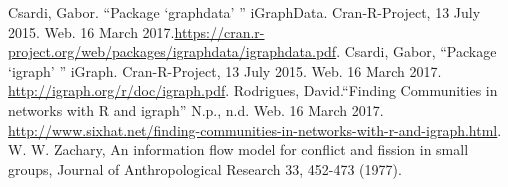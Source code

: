 \documentclass[letterpaper,11pt]{article}
\newcommand*{\srcPath}{../src}%
\begin{document}
%
%
%


\clearpage


\begin{thebibliography}{9}
Csardi, Gabor. ``Package `graphdata' '' iGraphData. Cran-R-Project, 13 July 2015. Web. 16 March 2017.\url{https://cran.r-project.org/web/packages/igraphdata/igraphdata.pdf}.
Csardi, Gabor, ``Package `igraph' '' iGraph. Cran-R-Project, 13 July 2015. Web. 16 March 2017. \url{http://igraph.org/r/doc/igraph.pdf}.
Rodrigues, David.``Finding Communities in networks with R and igraph'' N.p., n.d. Web. 16 March 2017. \url{http://www.sixhat.net/finding-communities-in-networks-with-r-and-igraph.html}.
W. W. Zachary, An information flow model for conflict and fission in small groups, Journal of Anthropological Research 33, 452-473 (1977).
\end{thebibliography}
\end{document}

